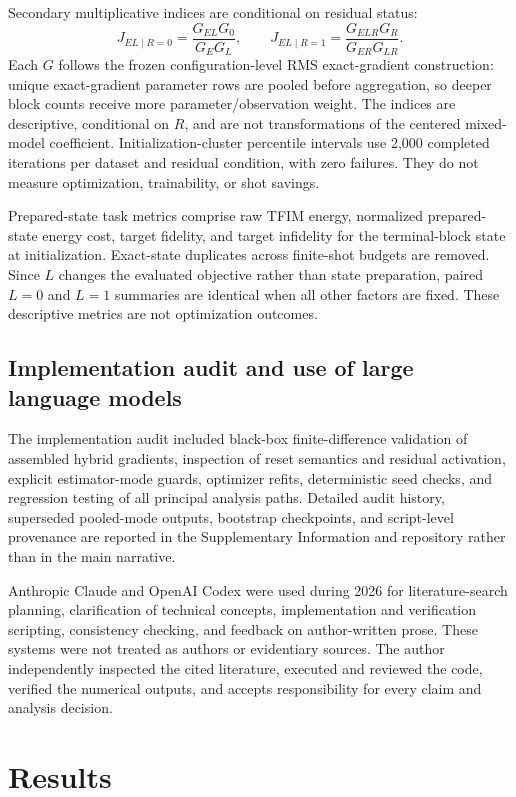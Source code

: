 \documentclass[pdflatex,sn-basic,Numbered]{sn-jnl}
\begin{document}
Secondary multiplicative indices are conditional on residual status:
\[
J_{EL\mid R=0}=\frac{G_{EL}G_0}{G_EG_L},\qquad
J_{EL\mid R=1}=\frac{G_{ELR}G_R}{G_{ER}G_{LR}}.
\]
Each $G$ follows the frozen configuration-level RMS exact-gradient construction: unique exact-gradient parameter rows are pooled before aggregation, so deeper block counts receive more parameter/observation weight. The indices are descriptive, conditional on $R$, and are not transformations of the centered mixed-model coefficient. Initialization-cluster percentile intervals use 2,000 completed iterations per dataset and residual condition, with zero failures. They do not measure optimization, trainability, or shot savings.

Prepared-state task metrics comprise raw TFIM energy, normalized prepared-state energy cost, target fidelity, and target infidelity for the terminal-block state at initialization. Exact-state duplicates across finite-shot budgets are removed. Since $L$ changes the evaluated objective rather than state preparation, paired $L=0$ and $L=1$ summaries are identical when all other factors are fixed. These descriptive metrics are not optimization outcomes.

\subsection{Implementation audit and use of large language models}

The implementation audit included black-box finite-difference validation of assembled hybrid gradients, inspection of reset semantics and residual activation, explicit estimator-mode guards, optimizer refits, deterministic seed checks, and regression testing of all principal analysis paths. Detailed audit history, superseded pooled-mode outputs, bootstrap checkpoints, and script-level provenance are reported in the Supplementary Information and repository rather than in the main narrative.

Anthropic Claude and OpenAI Codex were used during 2026 for literature-search planning, clarification of technical concepts, implementation and verification scripting, consistency checking, and feedback on author-written prose. These systems were not treated as authors or evidentiary sources. The author independently inspected the cited literature, executed and reviewed the code, verified the numerical outputs, and accepts responsibility for every claim and analysis decision.

\section{Results}
\end{document}
